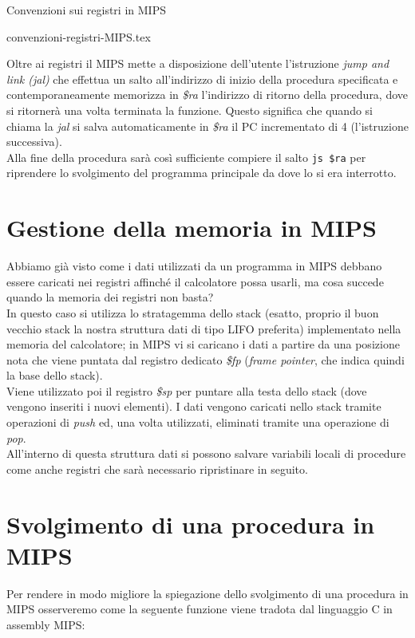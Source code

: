 \documentclass[class=book, crop=false]{standalone}
\begin{document}
\begin{table}[H]
	\centering
	\caption{Convenzioni sui registri in MIPS}
	{convenzioni-registri-MIPS.tex}
\end{table}

Oltre ai registri il MIPS mette a disposizione dell'utente l'istruzione \emph{jump and link (jal)} che effettua un salto all'indirizzo di inizio della procedura specificata e contemporaneamente memorizza in \emph{\$ra} l'indirizzo di ritorno della procedura, dove si ritornerà una volta terminata la funzione. Questo significa che quando si chiama la \emph{jal} si salva automaticamente in \emph{\$ra} il PC incrementato di 4 (l'istruzione successiva).\\
Alla fine della procedura sarà così sufficiente compiere il salto \texttt{js \$ra} per riprendere lo svolgimento del programma principale da dove lo si era interrotto.

\section{Gestione della memoria in MIPS}
Abbiamo già visto come i dati utilizzati da un programma in MIPS debbano essere caricati nei registri affinché il calcolatore possa usarli, ma cosa succede quando la memoria dei registri non basta?\\
In questo caso si utilizza lo stratagemma dello stack (esatto, proprio il buon vecchio stack la nostra struttura dati di tipo LIFO preferita) implementato nella memoria del calcolatore; in MIPS vi si caricano i dati a partire da una posizione nota che viene puntata dal registro dedicato \emph{\$fp} (\emph{frame pointer}, che indica quindi la base dello stack).\\
Viene utilizzato poi il registro \emph{\$sp} per puntare alla testa dello stack (dove vengono inseriti i nuovi elementi).
I dati vengono caricati nello stack tramite operazioni di \emph{push} ed, una volta utilizzati, eliminati tramite una operazione di \emph{pop}.\\
All'interno di questa struttura dati si possono salvare variabili locali di procedure come anche registri che sarà necessario ripristinare in seguito.\\

\section{Svolgimento di una procedura in MIPS}
Per rendere in modo migliore la spiegazione dello svolgimento di una procedura in MIPS osserveremo come la seguente funzione viene tradota dal linguaggio C in assembly MIPS:
\end{document}
